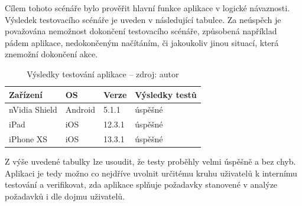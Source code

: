 Cílem tohoto scénáře bylo prověřit hlavní funkce aplikace v logické návaznosti. Výsledek testovacího scénáře je uveden v následující tabulce. Za neúspěch je považována nemožnost dokončení testovacího scénáře, způsobená například pádem aplikace, nedokončeným načítáním, či jakoukoliv jinou situací, která znemožní dokončení akce.

\begin{table}[H]
	\begin{tabularx}{\textwidth}{|X|X|X|X|}
		\hline
		Zařízení        & OS      & Verze  & Výsledky testů \\ \hline
		nVidia Shield   & Android & 5.1.1  & úspěšné \\ \hline
		iPad            & iOS     & 12.3.1       & úspěšné    \\ \hline
		iPhone XS       & iOS     & 13.3.1 &  úspěšné  \\ \hline
	\end{tabularx}
	\caption[Výsledky testování aplikace]{Výsledky testování aplikace -- zdroj: autor}
\end{table}

Z výše uvedené tabulky lze usoudit, že testy proběhly velmi úspěšně a bez chyb. Aplikaci je tedy možno co nejdříve uvolnit určitému kruhu uživatelů k internímu testování a verifikovat, zda aplikace splňuje požadavky stanovené v analýze požadavků i dle dojmu uživatelů.